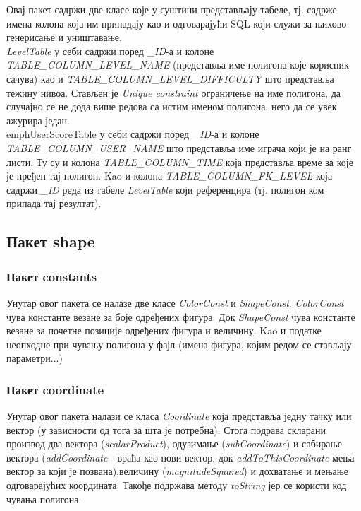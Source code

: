 Овај пакет садржи две класе које у суштини представљају табеле, тј. садрже имена колона која им припадају као и одговарајући SQL који служи за њихово генерисање и уништавање. 
\\ \indent
 \emph{LevelTable} у себи садржи поред \emph{\_ID}-а и колоне \emph{TABLE\_COLUMN\_LEVEL\_NAME } (представља име полигона које корисник сачува) као и \emph{TABLE\_COLUMN\_LEVEL\_DIFFICULTY} што представља тежину нивоа. Стављен је \emph{Unique constraint} ограничење на име полигона, да случајно се не дода више редова са истим именом полигона, него да се увек ажурира један. \
\\ \indent 	
 emph{UserScoreTable } у себи садржи поред \emph{\_ID}-а и колоне \emph{TABLE\_COLUMN\_USER\_NAME } што представља име играча који је на ранг листи, Ту су и колона \emph{TABLE\_COLUMN\_TIME}  која представља време за које је пређен тај полигон. Kao и колона \emph{TABLE\_COLUMN\_FK\_LEVEL} која садржи \emph{\_ID} реда из табеле \emph{LevelTable} који референцира (тј. полигон ком припада тај резултат).
 
\subsection{Пакет shape}
\subsubsection{Пакет constants}
Унутар овог пакета се налазе две класе \emph{ColorConst} и \emph{ShapeConst}. \emph{ColorConst} чува константе везане за боје одређених фигура. Док \emph{ShapeConst}  чува константе везане за почетне позиције одређених фигура и величину. Kao и податке неопходне при чувању полигона у фајл (имена фигура, којим редом се стављају параметри...)
\subsubsection{Пакет coordinate}
Унутар овог пакета налази се класа \emph{Coordinate} која представља једну тачку или вектор (у зависности од тога за шта је потребна). Стога подрава скларани производ два вектора (\emph{scalarProduct}), одузимање (\emph{subCoordinate}) и сабирање вектора (\emph{addCoordinate} - враћа као нови вектор, док \emph{addToThisCoordinate} мења вектор за који је позвана),величину (\emph{magnitudeSquared}) и дохватање и мењање одговарајућих координата. Такође подржава методу \emph{toString} јер се користи код чувања полигона. 
